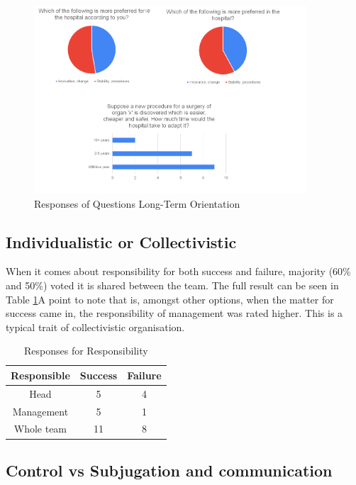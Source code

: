 \documentclass{article}
\begin{document}
\begin{figure}
    \begin{center}
        \includegraphics[width = 4in]{Time.png}
    \end{center}
    \caption{Responses of Questions Long-Term Orientation}
    \label{Time}
\end{figure}

\subsection{Individualistic or Collectivistic}

When it comes about responsibility for both success and failure, majority (60\% and 50\%) voted it is shared between the team. The full result can be seen in Table \ref{responsible}A point to note that is, amongst other options, when the matter for success came in, the responsibility of management was rated higher. This is a typical trait of collectivistic organisation.

\begin{table}
    \begin{center}
        \begin{tabular}{|c|c|c|}
            \hline
            Responsible & Success & Failure \\
            \hline
            Head & 5 & 4\\
            Management & 5 & 1\\
            Whole team & 11 & 8\\
            \hline
        \end{tabular}
        \caption{Responses for Responsibility}
        \label{responsible}
    \end{center}
\end{table}

\subsection{Control vs Subjugation and communication}
\end{document}
